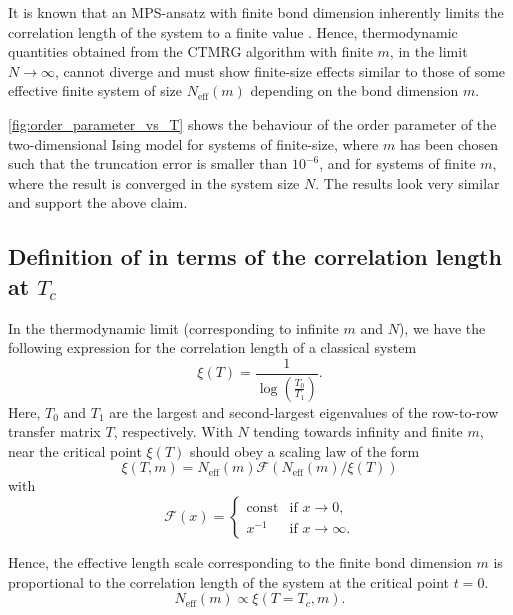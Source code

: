 It is known that an MPS-ansatz with finite bond dimension inherently limits the
correlation length of the system to a finite value \cite{wolf2006quantum}. Hence,
thermodynamic quantities obtained from the CTMRG algorithm with finite $m$, in the limit
$N \to \infty$, cannot diverge and must show finite-size effects similar to those of some
effective finite system of size $N_{\text{eff}}(m)$ depending on the bond dimension $m$.

\autoref{fig:order_parameter_vs_T} shows the behaviour of the order parameter of the
two-dimensional Ising model for systems of finite-size, where $m$ has been chosen such
that the truncation error is smaller than $10^{-6}$, and for systems of finite $m$, where
the result is converged in the system size $N$. The results look very similar and support
the above claim.


\subsection{Definition of  in terms of the correlation length at $T_c$}

In the thermodynamic limit (corresponding to infinite $m$ and $N$), we have the following
expression for the correlation length of a classical system
\cite{baxter1982exactly_correlation_length}
\begin{equation}
  \xi(T) = \frac{1}{\log\left(\frac{T_0}{T_1}\right)}.
\end{equation}
Here, $T_0$ and $T_1$ are the largest and second-largest eigenvalues of the row-to-row
transfer matrix $T$, respectively. With $N$ tending towards infinity and finite $m$, near
the critical point $\xi(T)$ should obey a scaling law of the form
\begin{equation}
  \xi(T, m) = N_{\text{eff}}(m) \mathcal{F}(N_{\text{eff}}(m) / \xi(T))
\end{equation}
with
\begin{equation}
  \mathcal{F}(x) = \begin{cases}
      \text{const} & \text{if } x \to 0, \\
      x^{-1} & \text{if } x \to \infty.
    \end{cases}
\end{equation}

Hence, the effective length scale corresponding to the finite bond dimension $m$ is
proportional to the correlation length of the system at the critical point $t = 0$.
\begin{equation}
  N_{\text{eff}}(m) \propto \xi(T = T_c, m).
\end{equation}


